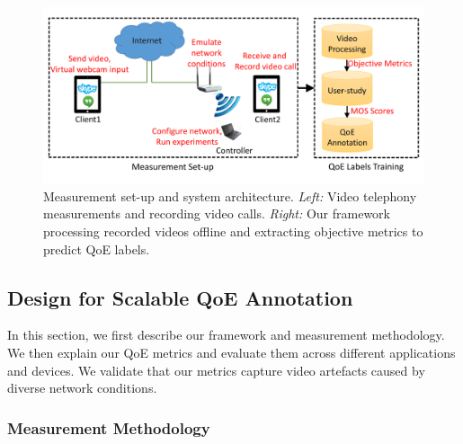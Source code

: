 \begin{figure}[t]
  \centering
   \vspace{0.55cm}
  \includegraphics[width=\linewidth]{sections/network-work/setup}
    \caption{Measurement set-up and system architecture. \textit{Left:} Video telephony measurements and recording video calls. \textit{Right:} Our framework processing recorded videos offline and extracting objective metrics to predict QoE labels.}
  \label{fig:set-up}
\end{figure}
\subsection{Design for Scalable QoE Annotation} \label{label:design}
In this section, we first describe our framework and measurement methodology. 
We then explain our QoE metrics and evaluate them across different applications and devices. We validate that our metrics capture video artefacts caused by diverse network conditions.
\subsubsection{Measurement Methodology}

